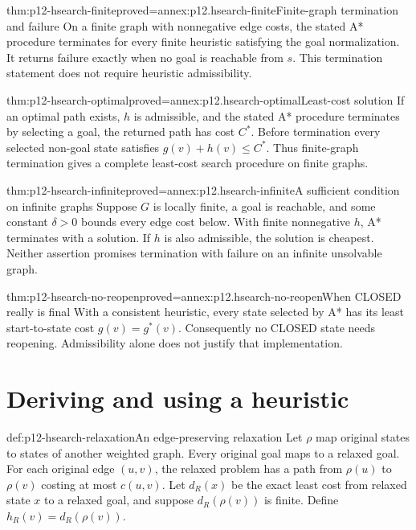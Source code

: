\begin{hbtheorem}{thm:p12-hsearch-finite}{proved=annex:p12.hsearch-finite}{Finite-graph termination and failure}
On a finite graph with nonnegative edge costs, the stated A* procedure
terminates for every finite heuristic satisfying the goal normalization.
It returns failure exactly when no goal is reachable from \(s\).
This termination statement does not require heuristic admissibility.
\end{hbtheorem}

\begin{hbtheorem}{thm:p12-hsearch-optimal}{proved=annex:p12.hsearch-optimal}{Least-cost solution}
If an optimal path exists, \(h\) is admissible, and the stated A*
procedure terminates by selecting a goal, the returned path has cost
\(C^*\). Before termination every selected non-goal state satisfies
\(g(v)+h(v)\le C^*\). Thus finite-graph termination gives a complete
least-cost search procedure on finite graphs.
\end{hbtheorem}

\begin{hbtheorem}{thm:p12-hsearch-infinite}{proved=annex:p12.hsearch-infinite}{A sufficient condition on infinite graphs}
Suppose \(G\) is locally finite, a goal is reachable, and some constant
\(\delta>0\) bounds every edge cost below. With finite nonnegative
\(h\), A* terminates with a solution. If \(h\) is also admissible,
the solution is cheapest. Neither assertion promises termination with
failure on an infinite unsolvable graph.
\end{hbtheorem}

\begin{hbtheorem}{thm:p12-hsearch-no-reopen}{proved=annex:p12.hsearch-no-reopen}{When CLOSED really is final}
With a consistent heuristic, every state selected by A* has its least
start-to-state cost \(g(v)=g^*(v)\). Consequently no CLOSED state needs
reopening. Admissibility alone does not justify that implementation.
\end{hbtheorem}

\section{Deriving and using a heuristic}

\begin{hbdefinition}{def:p12-hsearch-relaxation}{An edge-preserving relaxation}
Let \(\rho\) map original states to states of another weighted graph.
Every original goal maps to a relaxed goal. For each original edge
\((u,v)\), the relaxed problem has a path from \(\rho(u)\) to
\(\rho(v)\) costing at most \(c(u,v)\). Let \(d_R(x)\) be the exact
least cost from relaxed state \(x\) to a relaxed goal, and suppose
\(d_R(\rho(v))\) is finite. Define \(h_R(v)=d_R(\rho(v))\).
\end{hbdefinition}

